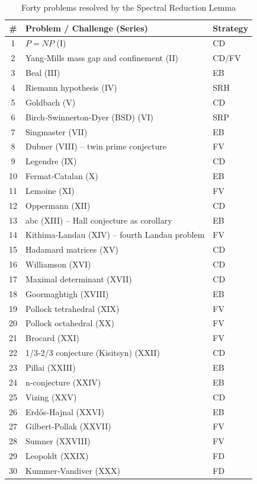 \documentclass[11pt,a4paper]{article}
\begin{document}
\begin{center}
\small
\begin{longtable}{@{}cll@{}}
\caption{Forty problems resolved by the Spectral Reduction Lemma}\\
\toprule
\# & Problem / Challenge (Series) & Strategy \\
\midrule
1 & \(P = NP\) (I) & CD \\
2 & Yang‑Mills mass gap and confinement (II) & CD/FV \\
3 & Beal (III) & EB \\
4 & Riemann hypothesis (IV) & SRH \\
5 & Goldbach (V) & CD \\
6 & Birch‑Swinnerton‑Dyer (BSD) (VI) & SRP \\
7 & Singmaster (VII) & EB \\
8 & Dubner (VIII) – twin prime conjecture & FV \\
9 & Legendre (IX) & CD \\
10 & Fermat‑Catalan (X) & EB \\
11 & Lemoine (XI) & FV \\
12 & Oppermann (XII) & CD \\
13 & abc (XIII) – Hall conjecture as corollary & EB \\
14 & Kithima‑Landau (XIV) – fourth Landau problem & FV \\
15 & Hadamard matrices (XV) & CD \\
16 & Williamson (XVI) & CD \\
17 & Maximal determinant (XVII) & CD \\
18 & Goormaghtigh (XVIII) & EB \\
19 & Pollock tetrahedral (XIX) & FV \\
20 & Pollock octahedral (XX) & FV \\
21 & Brocard (XXI) & FV \\
22 & 1/3‑2/3 conjecture (Kisitsyn) (XXII) & CD \\
23 & Pillai (XXIII) & EB \\
24 & n‑conjecture (XXIV) & EB \\
25 & Vizing (XXV) & CD \\
26 & Erdős‑Hajnal (XXVI) & EB \\
27 & Gilbert‑Pollak (XXVII) & FV \\
28 & Sumner (XXVIII) & FV \\
29 & Leopoldt (XXIX) & FD \\
30 & Kummer‑Vandiver (XXX) & FD \\

\end{longtable}
\end{center}
\end{document}
